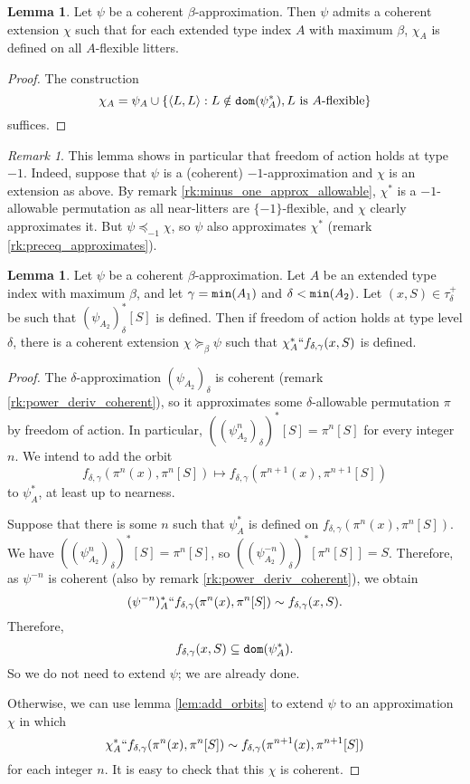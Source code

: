 \documentclass[112pt]{article}
\theoremstyle{definition}
\newtheorem{lemma}[theorem]{Lemma}
\theoremstyle{remark}
\newtheorem{remark}[theorem]{Remark}
\newcommand{\rk}[1]{{\color{blue}\sl #1}}
\newcommand{\hsuggest}[1]{{\color{magenta}#1}}
\begin{document}
\begin{lemma}\label{lem:foa_flexible}
  Let $\psi$ be a coherent $\beta$-approximation.
  Then $\psi$ admits a coherent extension $\chi$ such that for each extended type index $A$ with maximum $\beta$, $\chi_A$ is defined on all $A$-flexible litters.%
\end{lemma}
\begin{proof}
  The construction
  $$ \chi_A = \psi_A \cup \{ \langle L, L \rangle : L \notin {\tt dom}(\psi_A^*), L\ \mathrm{is}\ A\mathrm{\mbox{-flexible}} \} $$
  suffices.
\end{proof}
\begin{remark}
  This lemma shows in particular that freedom of action holds at type $-1$.
  Indeed, suppose that $\psi$ is a (coherent) $-1$-approximation and $\chi$ is an extension as above.
  By remark \ref{rk:minus_one_approx_allowable}, $\chi^*$ is a $-1$-allowable permutation as all near-litters are $\{-1\}$-flexible, and $\chi$ clearly approximates it.
  But $\psi \preceq_{-1} \chi$, so $\psi$ also approximates $\chi^*$ (remark \ref{rk:preceq_approximates}).
\end{remark}
\begin{lemma}\label{lem:foa_inflexible}
  Let $\psi$ be a coherent $\beta$-approximation.
  Let $A$ be an extended type index with maximum $\beta$, and let $\gamma = {\tt min}(A_1)$ and $\delta < {\tt min}(A_2)$.
  Let $(x, S) \in \tau_\delta^+$ be such that $(\psi_{A_2})_\delta^*[S]$ is defined.
  Then if freedom of action holds at type level $\delta$, there is a coherent extension $\chi \succeq_\beta \psi$ such that $
  \chi_A^* `` f_{\delta,\gamma}(x, S)$ is defined.
\end{lemma}
\begin{proof}
  The $\delta$-approximation $(\psi_{A_2})_\delta$ is coherent (remark \ref{rk:power_deriv_coherent}), so it approximates some $\delta$-allowable permutation $\pi$ by freedom of action.
  In particular, $((\psi_{A_2}^n)_\delta)^*[S] = \pi^n[S]$ for every integer $n$.
  We intend to add the orbit
  $$ f_{\delta,\gamma}(\pi^n(x), \pi^n[S]) \mapsto f_{\delta,\gamma}(\pi^{n+1}(x), \pi^{n+1}[S]) $$
  to $\psi_A^*$, at least up to nearness.

  Suppose that there is some $n$ such that $\psi_A^*$ is defined on $f_{\delta,\gamma}(\pi^n(x), \pi^n[S])$.
  We have $((\psi_{A_2}^n)_\delta)^*[S] = \pi^n[S]$, so $((\psi_{A_2}^{-n})_\delta)^*[\pi^n[S]] = S$.
  Therefore, as $\psi^{-n}$ is coherent (also by remark \ref{rk:power_deriv_coherent}), we obtain
  $$ (\psi^{-n})_A^* `` f_{\delta,\gamma}(\pi^n(x), \pi^n[S]) \sim f_{\delta,\gamma}(x, S). $$
  Therefore,
  $$ f_{\delta,\gamma}(x, S) \subseteq {\tt dom}(\psi_A^*).$$
  So we do not need to extend $\psi$; we are already done.

  Otherwise, we can use lemma \ref{lem:add_orbits} to extend $\psi$ to an approximation $\chi$ in which
  $$ \chi_A^* `` f_{\delta,\gamma}(\pi^n(x), \pi^n[S]) \sim f_{\delta,\gamma}(\pi^{n+1}(x), \pi^{n+1}[S]) $$
  for each integer $n$.
  It is easy to check that this $\chi$ is coherent.
\end{proof}
\end{document}
